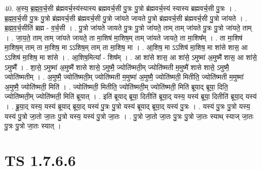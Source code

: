 \documentclass[17pt]{extarticle}
\begin{document}
40. अ॒स्य॒ ब्र॒ह्म॒व॒र्च॒सी ब्र॑ह्मवर्च॒स्य॑स्यास्य ब्रह्मवर्च॒सी पु॒त्रः पु॒त्रो ब्र॑ह्मवर्च॒स्य॑ स्यास्य ब्रह्मवर्च॒सी पु॒त्रः । . ब्र॒ह्म॒व॒र्च॒सी पु॒त्रः पु॒त्रो ब्र॑ह्मवर्च॒सी ब्र॑ह्मवर्च॒सी पु॒त्रो जा॑यते जायते पु॒त्रो ब्र॑ह्मवर्च॒सी ब्र॑ह्मवर्च॒सी पु॒त्रो जा॑यते । . ब्र॒ह्म॒व॒र्च॒सीति॑ ब्रह्म - व॒र्च॒सी । . पु॒त्रो जा॑यते जायते पु॒त्रः पु॒त्रो जा॑यते॒ ताम् ताम् जा॑यते पु॒त्रः पु॒त्रो जा॑यते॒ ताम् । . जा॒य॒ते॒ ताम् ताम् जा॑यते जायते॒ ता मा॒शिष॑ मा॒शिष॒म् ताम् जा॑यते जायते॒ ता मा॒शिष᳚म् । . ता मा॒शिष॑ मा॒शिष॒म् ताम् ता मा॒शिष॒ मा ऽऽशिष॒म् ताम् ता मा॒शिष॒ मा । . आ॒शिष॒ मा ऽऽशिष॑ मा॒शिष॒ मा शा॑से शास॒ आ ऽऽशिष॑ मा॒शिष॒ मा शा॑से । . आ॒शिष॒मित्या᳚ - शिष᳚म् । . आ शा॑से शास॒ आ शा॑से॒ ऽमुष्मा॑ अ॒मुष्मै॑ शास॒ आ शा॑से॒ ऽमुष्मै᳚ । . शा॒से॒ ऽमुष्मा॑ अ॒मुष्मै॑ शासे शासे॒ ऽमुष्मै॒ ज्योति॑ष्मती॒म् ज्योति॑ष्मती म॒मुष्मै॑ शासे शासे॒ ऽमुष्मै॒ ज्योति॑ष्मतीम् । . अ॒मुष्मै॒ ज्योति॑ष्मती॒म् ज्योति॑ष्मती म॒मुष्मा॑ अ॒मुष्मै॒ ज्योति॑ष्मती॒ मितीति॒ ज्योति॑ष्मती म॒मुष्मा॑ अ॒मुष्मै॒ ज्योति॑ष्मती॒ मिति॑ । . ज्योति॑ष्मती॒ मितीति॒ ज्योति॑ष्मती॒म् ज्योति॑ष्मती॒ मिति॑ ब्रूयाद् ब्रूया॒ दिति॒ ज्योति॑ष्मती॒म् ज्योति॑ष्मती॒ मिति॑ ब्रूयात् । . इति॑ ब्रूयाद् ब्रूया॒ दितीति॑ ब्रूया॒द् यस्य॒ यस्य॑ ब्रूया॒ दितीति॑ ब्रूया॒द् यस्य॑ । . ब्रू॒या॒द् यस्य॒ यस्य॑ ब्रूयाद् ब्रूया॒द् यस्य॑ पु॒त्रः पु॒त्रो यस्य॑ ब्रूयाद् ब्रूया॒द् यस्य॑ पु॒त्रः । . यस्य॑ पु॒त्रः पु॒त्रो यस्य॒ यस्य॑ पु॒त्रो जा॒तो जा॒तः पु॒त्रो यस्य॒ यस्य॑ पु॒त्रो जा॒तः । . पु॒त्रो जा॒तो जा॒तः पु॒त्रः पु॒त्रो जा॒तः स्याथ् स्याज् जा॒तः पु॒त्रः पु॒त्रो जा॒तः स्यात् । \newline
\pagebreak
{}

\section{ TS 1.7.6.6 }
\end{document}

